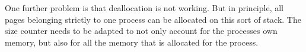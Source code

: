 One further problem is that deallocation is not working. But in principle, all pages belonging
strictly to one process can be allocated on this sort of stack. The size counter
needs to be adapted to not only account for the processes own memory, but also
for all the memory that is allocated for the process.

